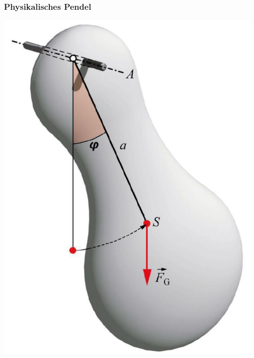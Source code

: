 \subsubsection{Physikalisches Pendel}

\begin{minipage}{0.32\linewidth}
\includegraphics[width=0.98\linewidth]{Bilder/Wellen-Optik/physikalisches_pendel} \\
\end{minipage}
\hfill
